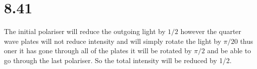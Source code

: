 \documentclass[12pt,a4paper]{article}
\begin{document}
\section{8.41}
The initial polariser will reduce the outgoing light by $1/2$ however the quarter wave plates will not reduce intensity and will simply rotate the light by $\pi/20$ thus oner it has gone through all of the plates it will be rotated by $\pi/2$ and be able to go through the last polariser.  So the total intensity will be reduced by 1/2.
\end{document}
